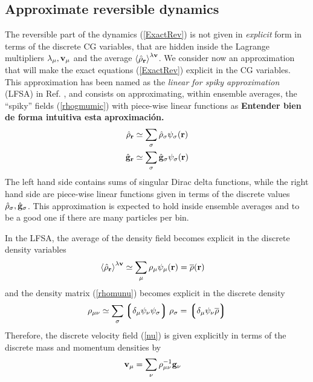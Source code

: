 \documentclass[b5paper,openright,11pt]{book}
\newcommand{\Note}[1]{{\bf \color{red}#1}}    %
\newcommand{\llangle}{\left\langle}
\newcommand{\rrangle}{\right\rangle}
\newcommand{\llg}{\left\lgroup}
\newcommand{\rlg}{\right\rgroup}
\begin{document}
\subsection{Approximate reversible dynamics}
The reversible part  of the dynamics (\ref{ExactRev}) is  not given in
\textit{explicit} form in terms of the discrete CG variables, that are
hidden inside  the Lagrange multipliers $\lambda_\mu,{\bf  v}_\mu$ and
the  average $\llangle  \hat{\rho}_{\bf r}\rrangle^{\lambda{\bf  v}}$.
We consider  now an approximation  that will make the  exact equations
(\ref{ExactRev}) explicit in the CG variables.  This approximation has
been named  as the \textit{linear  for spiky approximation}  (LFSA) in
Ref.   \cite{Donev},  and  consists on  approximating,  within  ensemble
averages,  the ``spiky''  fields (\ref{rhogmumic})  with piece-wise
linear functions as \Note{Entender bien de forma intuitiva esta aproximación.}
\begin{align}
  \hat{\rho}_{\bf r}&\simeq \sum_\sigma\hat{\rho}_{\sigma} \psi_\sigma({\bf r})
\nonumber\\
  \hat{\bf g}_{\bf r} &\simeq \sum_\sigma\hat{\bf g}_{\sigma} \psi_\sigma({\bf r})
\label{LFSA}
\end{align}
The left  hand side contains  sums of singular Dirac  delta functions,
while the  right hand  side are piece-wise  linear functions  given in
terms   of   the  discrete   values   $\hat{\rho}_{\sigma} ,\hat{\bf
  g}_\sigma $.   This  approximation  is  expected  to  hold  inside
ensemble averages and to be a good one if there are many particles per
bin. 

In the LFSA, the average of the density field becomes explicit
in the discrete density variables
\begin{align}
  \llangle \hat{\rho}_{\bf r}\rrangle^{\lambda{\bf v}}&\simeq
\sum_\mu\rho_\mu\psi_\mu({\bf r})=\overline{\rho}({\bf r})
\end{align}
and the density matrix (\ref{rhomunu}) becomes explicit in the discrete density 
\begin{align}
  \rho_{\mu\nu} \simeq \sum_\sigma\llg\delta_\mu\psi_\nu\psi_\sigma\rlg\rho_\sigma
=\llg\delta_\mu\psi_\nu\overline{\rho}\rlg
\label{calR1}
\end{align}
Therefore, the discrete velocity  field (\ref{nu}) is given explicitly
in terms of the discrete mass and momentum densities by
\begin{align}
{\bf v}_\mu&=\sum_\nu\rho^{-1}_{\mu\nu}{\bf g}_\nu
\label{un}
\end{align}
\end{document}
